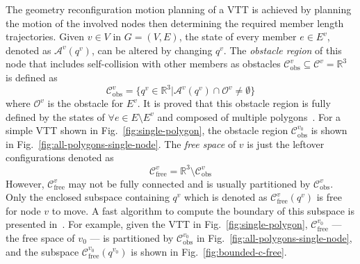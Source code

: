 \documentclass[journal]{IEEEtran}
\begin{document}
The geometry reconfiguration motion planning of a VTT is achieved by
planning the motion of the involved nodes then determining the
required member length trajectories. Given $v\in V$ in $G = (V, E)$,
the state of every member $e\in E^v$, denoted as $\mathcal{A}^v(q^v)$,
can be altered by changing $q^v$. The \textit{obstacle region} of this
node that includes self-collision with other members as obstacles
$\mathcal{C}^v_{\mathrm{obs}}\subseteq \mathcal{C}^v = \mathbb{R}^3$
is defined as
\begin{equation}
  \label{eq:obstacle}
  \mathcal{C}^v_{\mathrm{obs}} = \{q^v\in \mathbb{R}^3\vert \mathcal{A}^v(q^v) \cap
   \mathcal{O}^v \neq \emptyset\}
\end{equation}
where $\mathcal{O}^v$ is the obstacle for $E^v$. It is proved that
this obstacle region is fully defined by the states of
$\forall e\in E\setminus E^v$ and composed of multiple
polygons~\cite{Liu-vtt-cspace-icra-2020}. For a simple VTT shown in
Fig.~\ref{fig:single-polygon}, the obstacle region
$\mathcal{C}_{\mathrm{obs}}^{v_0}$ is shown in
Fig.~\ref{fig:all-polygons-single-node}. The \textit{free space} of
$v$ is just the leftover configurations denoted as
\begin{equation}
  \label{eq:free-space}
  \mathcal{C}_{\mathrm{free}}^v = \mathbb{R}^3 \setminus \mathcal{C}_{\mathrm{obs}}^v
\end{equation}
However, $\mathcal{C}_{\mathrm{free}}^v$ may not be fully connected
and is usually partitioned by $\mathcal{C}_{\mathrm{obs}}^v$. Only the
enclosed subspace containing $q^v$ which is denoted as
$\mathcal{C}_{\mathrm{free}}^v(q^v)$ is free for node $v$ to move. A
fast algorithm to compute the boundary of this subspace is presented
in~\cite{Liu-vtt-cspace-icra-2020}. For example, given the VTT in
Fig.~\ref{fig:single-polygon}, $\mathcal{C}_{\mathrm{free}}^{v_0}$ ---
the free space of $v_0$ --- is partitioned by
$\mathcal{C}_{\mathrm{obs}}^{v_0}$ in
Fig.~\ref{fig:all-polygons-single-node}, and the subspace
$\mathcal{C}_{\mathrm{free}}^{v_0}(q^{v_0})$ is shown in
Fig.~\ref{fig:bounded-c-free}.
\end{document}
